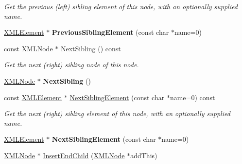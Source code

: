 \begin{DoxyCompactItemize}
\begin{DoxyCompactList}\small\item\em Get the previous (left) sibling element of this node, with an optionally supplied name. \end{DoxyCompactList}\item 
\mbox{\label{classtinyxml2_1_1_x_m_l_node_ae4f37eb6cd405bdf1d57caa066e36d87}} 
\hyperlink{classtinyxml2_1_1_x_m_l_element}{X\+M\+L\+Element} $\ast$ {\bfseries Previous\+Sibling\+Element} (const char $\ast$name=0)
\item 
\mbox{\label{classtinyxml2_1_1_x_m_l_node_a79db9ef0fe014d27790f2218b87bcbb5}} 
const \hyperlink{classtinyxml2_1_1_x_m_l_node}{X\+M\+L\+Node} $\ast$ \hyperlink{classtinyxml2_1_1_x_m_l_node_a79db9ef0fe014d27790f2218b87bcbb5}{Next\+Sibling} () const
\begin{DoxyCompactList}\small\item\em Get the next (right) sibling node of this node. \end{DoxyCompactList}\item 
\mbox{\label{classtinyxml2_1_1_x_m_l_node_aeb7d4dfd8fb924ef86e7cb72183acbac}} 
\hyperlink{classtinyxml2_1_1_x_m_l_node}{X\+M\+L\+Node} $\ast$ {\bfseries Next\+Sibling} ()
\item 
\mbox{\label{classtinyxml2_1_1_x_m_l_node_a14ea560df31110ff07a9f566171bf797}} 
const \hyperlink{classtinyxml2_1_1_x_m_l_element}{X\+M\+L\+Element} $\ast$ \hyperlink{classtinyxml2_1_1_x_m_l_node_a14ea560df31110ff07a9f566171bf797}{Next\+Sibling\+Element} (const char $\ast$name=0) const
\begin{DoxyCompactList}\small\item\em Get the next (right) sibling element of this node, with an optionally supplied name. \end{DoxyCompactList}\item 
\mbox{\label{classtinyxml2_1_1_x_m_l_node_af1225412584d4a2126f55e96a12e0ec0}} 
\hyperlink{classtinyxml2_1_1_x_m_l_element}{X\+M\+L\+Element} $\ast$ {\bfseries Next\+Sibling\+Element} (const char $\ast$name=0)
\item 
\hyperlink{classtinyxml2_1_1_x_m_l_node}{X\+M\+L\+Node} $\ast$ \hyperlink{classtinyxml2_1_1_x_m_l_node_ae3b422e98914d6002ca99bb1d2837103}{Insert\+End\+Child} (\hyperlink{classtinyxml2_1_1_x_m_l_node}{X\+M\+L\+Node} $\ast$add\+This)

\end{DoxyCompactItemize}
